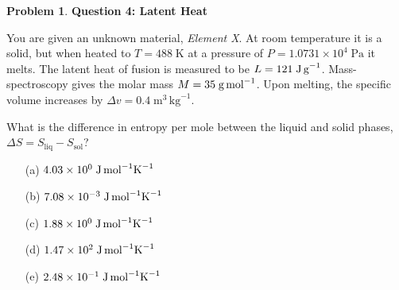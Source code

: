 \documentclass[10pt]{article}
\theoremstyle{definition} %
\newtheorem{problem}{Problem}
\theoremstyle{plain} %
\begin{document}
                                                        \begin{problem}
                                                          \textbf{Question 4: Latent Heat}
                                                          
                                                          You are given an unknown material, \emph{Element X}.  
                                                          At room temperature it is a solid, but when heated to
                                                          \(T = 488\;\text{K}\) at a pressure of \(P = 1.0731\times10^{4}\;\text{Pa}\)
                                                          it melts.  
                                                          The latent heat of fusion is measured to be
                                                          \(L = 121\;\text{J\,g}^{-1}\).
                                                          Mass-spectroscopy gives the molar mass
                                                          \(M = 35\;\text{g\,mol}^{-1}\).
                                                          Upon melting, the specific volume increases by
                                                          \(\Delta v = 0.4\;\text{m}^{3}\,\text{kg}^{-1}\).
                                                          
                                                          \medskip
                                                          What is the difference in entropy per mole between the liquid and solid
                                                          phases, \(\Delta S = S_{\text{liq}} - S_{\text{sol}}\)?
                                                          
                                                          \begin{enumerate}
                                                            \item[(a)] \(4.03\times10^{0}\;\text{J\,mol}^{-1}\text{K}^{-1}\)
                                                            \item[(b)] \(7.08\times10^{-3}\;\text{J\,mol}^{-1}\text{K}^{-1}\)
                                                            \item[(c)] \(1.88\times10^{0}\;\text{J\,mol}^{-1}\text{K}^{-1}\)
                                                            \item[(d)] \(1.47\times10^{2}\;\text{J\,mol}^{-1}\text{K}^{-1}\)
                                                            \item[(e)] \(2.48\times10^{-1}\;\text{J\,mol}^{-1}\text{K}^{-1}\)
                                                          \end{enumerate}
                                                          \end{problem}
\end{document}
